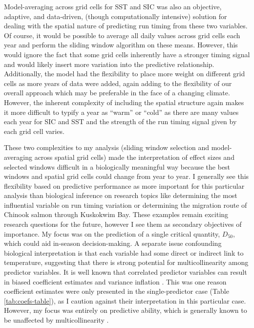 \documentclass[12pt,]{book}
\theoremstyle{definition}
\theoremstyle{definition}
\theoremstyle{definition}
\theoremstyle{remark}
\begin{document}
Model-averaging across grid cells for SST and SIC was also an objective,
adaptive, and data-driven, (though computationally intensive) solution
for dealing with the spatial nature of predicting run timing from these
two variables. Of course, it would be possible to average all daily
values across grid cells each year and perform the sliding window
algorithm on these means. However, this would ignore the fact that some
grid cells inherently have a stronger timing signal and would likely
insert more variation into the predictive relationship. Additionally,
the model had the flexibility to place more weight on different grid
cells as more years of data were added, again adding to the flexibility
of our overall approach which may be preferable in the face of a
changing climate. However, the inherent complexity of including the
spatial structure again makes it more difficult to typify a year as
``warm'' or ``cold'' as there are many values each year for SIC and SST
and the strength of the run timing signal given by each grid cell
varies.

These two complexities to my analysis (sliding window selection and
model-averaging across spatial grid cells) made the interpretation of
effect sizes and selected windows difficult in a biologically meaningful
way because the best windows and spatial grid cells could change from
year to year. I generally see this flexibility based on predictive
performance as more important for this particular analysis than
biological inference on research topics like determining the most
influential variable on run timing variation or determining the
migration route of Chinook salmon through Kuskokwim Bay. These examples
remain exciting research questions for the future, however I see them as
secondary objectives of importance. My focus was on the prediction of a
single critical quantity, \(D_{50}\), which could aid in-season
decision-making. A separate issue confounding biological interpretation
is that each variable had some direct or indirect link to temperature,
suggesting that there is strong potential for multicollinearity among
predictor variables. It is well known that correlated predictor
variables can result in biased coefficient estimates and variance
inflation \citep{neter-etal-1996}. This was one reason coefficient
estimates were only presented in the single-predictor case (Table
\ref{tab:coefs-table}), as I caution against their interpretation in
this particular case. However, my focus was entirely on predictive
ability, which is generally known to be unaffected by multicollinearity
\citep{graham-2003}.
\end{document}
